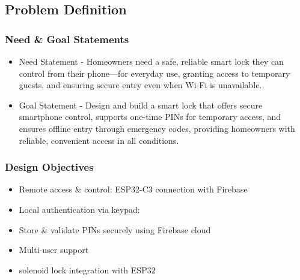 \subsection{Problem Definition}

\subsubsection{Need \& Goal Statements}
\begin{itemize}
    \item Need Statement - Homeowners need a safe, reliable smart lock they can control from their phone—for everyday use, granting access to temporary guests, and ensuring secure entry even when Wi-Fi is unavailable.
    
    \item Goal Statement - Design and build a smart lock that offers secure smartphone control, supports one-time PINs for temporary access, and ensures offline entry through emergency codes, providing homeowners with reliable, convenient access in all conditions.
\end{itemize}


\subsubsection{Design Objectives}
\begin{itemize}
    \item Remote access \& control: ESP32-C3 connection with Firebase
    
    \item Local authentication via keypad:
    \item Store \& validate PINs securely using Firebase cloud
    \item Multi-user support
    \item solenoid lock integration with ESP32

\end{itemize}